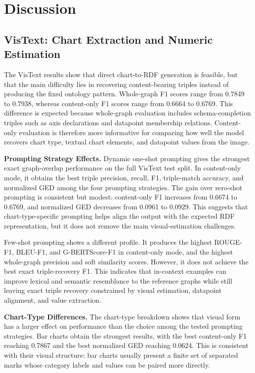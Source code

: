 \documentclass[preprint,12pt]{elsarticle}
\begin{document}
\section{Discussion}\label{sec:discussion}

\subsection{VisText: Chart Extraction and Numeric Estimation}

The VisText results show that direct chart-to-RDF generation is feasible, but that the main difficulty lies in recovering content-bearing triples instead of producing the fixed ontology pattern. Whole-graph F1 scores range from 0.7849 to 0.7938, whereas content-only F1 scores range from 0.6664 to 0.6769. This difference is expected because whole-graph evaluation includes schema-completion triples such as axis declarations and datapoint membership relations. Content-only evaluation is therefore more informative for comparing how well the model recovers chart type, textual chart elements, and datapoint values from the image.

\textbf{Prompting Strategy Effects.} Dynamic one-shot prompting gives the strongest exact graph-overlap performance on the full VisText test split. In content-only mode, it obtains the best triple precision, recall, F1, triple-match accuracy, and normalized GED among the four prompting strategies. The gain over zero-shot prompting is consistent but modest: content-only F1 increases from 0.6674 to 0.6769, and normalized GED decreases from 0.0961 to 0.0929. This suggests that chart-type-specific prompting helps align the output with the expected RDF representation, but it does not remove the main visual-estimation challenges.

Few-shot prompting shows a different profile. It produces the highest ROUGE-F1, BLEU-F1, and G-BERTScore-F1 in content-only mode, and the highest whole-graph precision and soft similarity scores. However, it does not achieve the best exact triple-recovery F1. This indicates that in-context examples can improve lexical and semantic resemblance to the reference graphs while still leaving exact triple recovery constrained by visual estimation, datapoint alignment, and value extraction.

\textbf{Chart-Type Differences.} The chart-type breakdown shows that visual form has a larger effect on performance than the choice among the tested prompting strategies. Bar charts obtain the strongest results, with the best content-only F1 reaching 0.7867 and the best normalized GED reaching 0.0624. This is consistent with their visual structure: bar charts usually present a finite set of separated marks whose category labels and values can be paired more directly.
\end{document}
